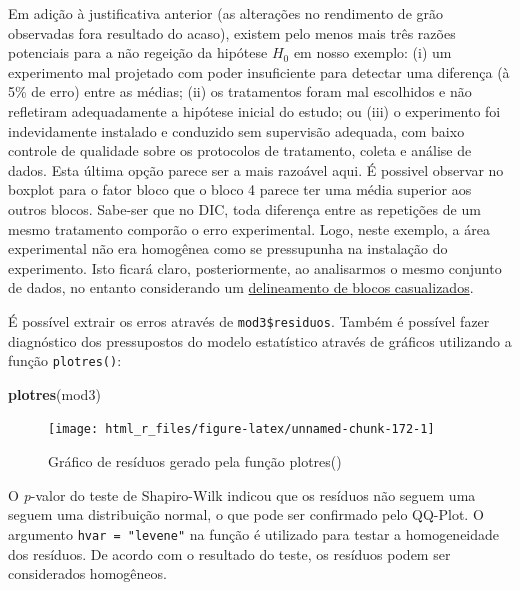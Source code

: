 \documentclass[
]{book}
\newenvironment{Shaded}{\begin{snugshade}}{\end{snugshade}}
\newcommand{\KeywordTok}[1]{\textcolor[rgb]{0.13,0.29,0.53}{\textbf{#1}}}
\newcommand{\NormalTok}[1]{#1}
\begin{document}
Em adição à justificativa anterior (as alterações no rendimento de grão observadas fora resultado do acaso), existem pelo menos mais três razões potenciais para a não regeição da hipótese \(H_0\) em nosso exemplo: (i) um experimento mal projetado com poder insuficiente para detectar uma diferença (à 5\% de erro) entre as médias; (ii) os tratamentos foram mal escolhidos e não refletiram adequadamente a hipótese inicial do estudo; ou (iii) o experimento foi indevidamente instalado e conduzido sem supervisão adequada, com baixo controle de qualidade sobre os protocolos de tratamento, coleta e análise de dados. Esta última opção parece ser a mais razoável aqui. É possivel observar no boxplot para o fator bloco que o bloco 4 parece ter uma média superior aos outros blocos. Sabe-ser que no DIC, toda diferença entre as repetições de um mesmo tratamento comporão o erro experimental. Logo, neste exemplo, a área experimental não era homogênea como se pressupunha na instalação do experimento. Isto ficará claro, posteriormente, ao analisarmos o mesmo conjunto de dados, no entanto considerando um \hypertarget{DICQUALI}{\hyperlink{DBCQUALI}{delineamento de blocos casualizados}}.

É possível extrair os erros através de \texttt{mod3\$residuos}. Também é possível fazer diagnóstico dos pressupostos do modelo estatístico através de gráficos utilizando a função \texttt{plotres()}: 

\begin{Shaded}
\begin{Highlighting}[]
\KeywordTok{plotres}\NormalTok{(mod3)}
\end{Highlighting}
\end{Shaded}

\begin{figure}

{\centering \texttt{[image: html\_r\_files/figure-latex/unnamed-chunk-172-1]} 

}

\caption{Gráfico de resíduos gerado pela função plotres()}\label{fig:unnamed-chunk-172}
\end{figure}

O \emph{p}-valor do teste de Shapiro-Wilk indicou que os resíduos  não seguem uma seguem uma distribuição normal, o que pode ser confirmado pelo QQ-Plot. O argumento \texttt{hvar\ =\ "levene"} na função é utilizado para testar a homogeneidade dos resíduos. De acordo com o resultado do teste, os resíduos podem ser considerados homogêneos.
\end{document}

